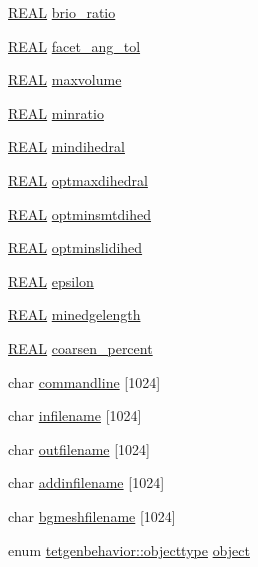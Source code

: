 \begin{DoxyCompactItemize}
\item 
\hyperlink{tetgen_8h_a4b654506f18b8bfd61ad2a29a7e38c25}{R\-E\-A\-L} \hyperlink{classtetgenbehavior_a3aad13e8567253dd2d2b2e95a4e38ee9}{brio\-\_\-ratio}
\item 
\hyperlink{tetgen_8h_a4b654506f18b8bfd61ad2a29a7e38c25}{R\-E\-A\-L} \hyperlink{classtetgenbehavior_a200a832d1ad2ff0759bd957c9c226608}{facet\-\_\-ang\-\_\-tol}
\item 
\hyperlink{tetgen_8h_a4b654506f18b8bfd61ad2a29a7e38c25}{R\-E\-A\-L} \hyperlink{classtetgenbehavior_a8f6cea3179c0be4c104e4a79392952da}{maxvolume}
\item 
\hyperlink{tetgen_8h_a4b654506f18b8bfd61ad2a29a7e38c25}{R\-E\-A\-L} \hyperlink{classtetgenbehavior_a1c250b5245602594e5c3e0a61d6ba3bd}{minratio}
\item 
\hyperlink{tetgen_8h_a4b654506f18b8bfd61ad2a29a7e38c25}{R\-E\-A\-L} \hyperlink{classtetgenbehavior_aa48e21ee0ac18d3adadea746e9e39055}{mindihedral}
\item 
\hyperlink{tetgen_8h_a4b654506f18b8bfd61ad2a29a7e38c25}{R\-E\-A\-L} \hyperlink{classtetgenbehavior_a191cab44548550697e3d672c9966c61b}{optmaxdihedral}
\item 
\hyperlink{tetgen_8h_a4b654506f18b8bfd61ad2a29a7e38c25}{R\-E\-A\-L} \hyperlink{classtetgenbehavior_a3f4246164c85bd2d1f88ed4e9c739398}{optminsmtdihed}
\item 
\hyperlink{tetgen_8h_a4b654506f18b8bfd61ad2a29a7e38c25}{R\-E\-A\-L} \hyperlink{classtetgenbehavior_a7298676875d7609798023ec2df17ccb9}{optminslidihed}
\item 
\hyperlink{tetgen_8h_a4b654506f18b8bfd61ad2a29a7e38c25}{R\-E\-A\-L} \hyperlink{classtetgenbehavior_a65abc49ced365588d5c7bdfce638fab5}{epsilon}
\item 
\hyperlink{tetgen_8h_a4b654506f18b8bfd61ad2a29a7e38c25}{R\-E\-A\-L} \hyperlink{classtetgenbehavior_a51d41b9aaa89c0dc620c4af78848dfde}{minedgelength}
\item 
\hyperlink{tetgen_8h_a4b654506f18b8bfd61ad2a29a7e38c25}{R\-E\-A\-L} \hyperlink{classtetgenbehavior_ac9aa3f69cf550eb2ee81fc0cae2fb444}{coarsen\-\_\-percent}
\item 
char \hyperlink{classtetgenbehavior_a56dcfc2ab395c63b7f99d84b2cd1f4e8}{commandline} \mbox{[}1024\mbox{]}
\item 
char \hyperlink{classtetgenbehavior_ac879f6843038d5428199079c515ce6e6}{infilename} \mbox{[}1024\mbox{]}
\item 
char \hyperlink{classtetgenbehavior_aa066e0b8f2b5b3d0f9e5c6b74e8eadc4}{outfilename} \mbox{[}1024\mbox{]}
\item 
char \hyperlink{classtetgenbehavior_a627804470698cc1883fd93999727e334}{addinfilename} \mbox{[}1024\mbox{]}
\item 
char \hyperlink{classtetgenbehavior_ae72a1c6b8d7389d4fad21fa584207aba}{bgmeshfilename} \mbox{[}1024\mbox{]}
\item 
enum \hyperlink{classtetgenbehavior_aeea08e7334fde4251b74a8247bcc54b8}{tetgenbehavior\-::objecttype} \hyperlink{classtetgenbehavior_ae01337ff20025a815a4f2e4d8c3d2871}{object}
\end{DoxyCompactItemize}


